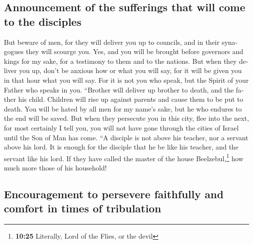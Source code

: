 \begin{paracol}{2}
\begin{otherlanguage}{english}
\hypertarget{announcement-of-the-sufferings-that-will-come-to-the-disciples}{%
\subsection{Announcement of the sufferings that will come to the
disciples}\label{announcement-of-the-sufferings-that-will-come-to-the-disciples}}

 But beware of men, for they will deliver you up to
councils, and in their synagogues they will scourge you. 
Yes, and you will be brought before governors and kings for my sake, for
a testimony to them and to the nations.  But when they
deliver you up, don't be anxious how or what you will say, for it will
be given you in that hour what you will say.  For it is
not you who speak, but the Spirit of your Father who speaks in you.
 ``Brother will deliver up brother to death, and the
father his child. Children will rise up against parents and cause them
to be put to death.  You will be hated by all men for my
name's sake, but he who endures to the end will be saved.
 But when they persecute you in this city, flee into the
next, for most certainly I tell you, you will not have gone through the
cities of Israel until the Son of Man has come.  ``A
disciple is not above his teacher, nor a servant above his lord.
 It is enough for the disciple that he be like his
teacher, and the servant like his lord. If they have called the master
of the house Beelzebul,\footnote{\textbf{10:25} Literally, Lord of the
  Flies, or the devil} how much more those of his household!

\hypertarget{encouragement-to-persevere-faithfully-and-comfort-in-times-of-tribulation}{%
\subsection{Encouragement to persevere faithfully and comfort in times
of
tribulation}\label{encouragement-to-persevere-faithfully-and-comfort-in-times-of-tribulation}}


\end{otherlanguage}
\end{paracol}
